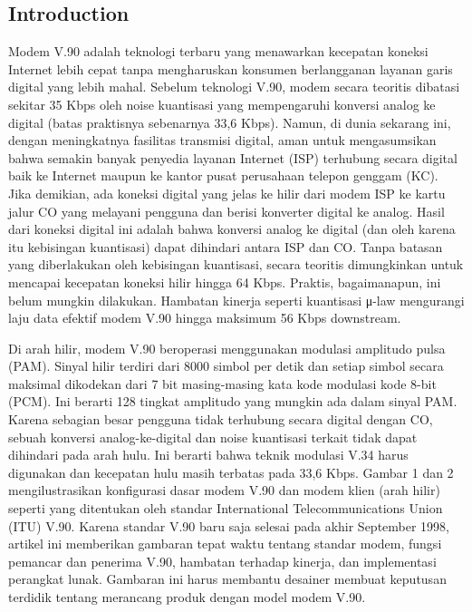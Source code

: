 \subsection{Introduction} Modem V.90 adalah teknologi terbaru yang menawarkan kecepatan koneksi Internet lebih cepat tanpa mengharuskan konsumen berlangganan layanan garis digital yang lebih mahal. Sebelum teknologi V.90, modem secara teoritis dibatasi sekitar 35 Kbps oleh noise kuantisasi yang mempengaruhi konversi analog ke digital (batas praktisnya sebenarnya 33,6 Kbps). Namun, di dunia sekarang ini, dengan meningkatnya fasilitas transmisi digital, aman untuk mengasumsikan bahwa semakin banyak penyedia layanan Internet (ISP) terhubung secara digital baik ke Internet maupun ke kantor pusat perusahaan telepon genggam (KC). Jika demikian, ada koneksi digital yang jelas ke hilir dari modem ISP ke kartu jalur CO yang melayani pengguna dan berisi konverter digital ke analog. Hasil dari koneksi digital ini adalah bahwa konversi analog ke digital (dan oleh karena itu kebisingan kuantisasi) dapat dihindari antara ISP dan CO. Tanpa batasan yang diberlakukan oleh kebisingan kuantisasi, secara teoritis dimungkinkan untuk mencapai kecepatan koneksi hilir hingga 64 Kbps. Praktis, bagaimanapun, ini belum mungkin dilakukan. Hambatan kinerja seperti kuantisasi μ-law mengurangi laju data efektif modem V.90 hingga maksimum 56 Kbps downstream.

Di arah hilir, modem V.90 beroperasi menggunakan modulasi amplitudo pulsa (PAM). Sinyal hilir terdiri dari 8000 simbol per detik dan setiap simbol secara maksimal dikodekan dari 7 bit masing-masing kata kode modulasi kode 8-bit (PCM). Ini berarti 128 tingkat amplitudo yang mungkin ada dalam sinyal PAM. Karena sebagian besar pengguna tidak terhubung secara digital dengan CO, sebuah konversi analog-ke-digital dan noise kuantisasi terkait tidak dapat dihindari pada arah hulu. Ini berarti bahwa teknik modulasi V.34 harus digunakan dan kecepatan hulu masih terbatas pada 33,6 Kbps. Gambar 1 dan 2 mengilustrasikan konfigurasi dasar modem V.90 dan modem klien (arah hilir) seperti yang ditentukan oleh standar International Telecommunications Union (ITU) V.90.
Karena standar V.90 baru saja selesai pada akhir September 1998, artikel ini memberikan gambaran tepat waktu tentang standar modem, fungsi pemancar dan penerima V.90, hambatan terhadap kinerja, dan implementasi perangkat lunak. Gambaran ini harus membantu desainer membuat keputusan terdidik tentang merancang produk dengan model modem V.90.

